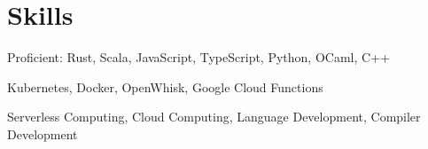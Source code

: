 \section{Skills}

%
{}%
{}%
{}%
{Proficient: Rust, Scala, JavaScript, TypeScript, Python, OCaml, C++%
%
\newline{}
}

%
{}%
{}%
{}%
{Kubernetes, Docker, OpenWhisk, Google Cloud Functions
\newline{}
}

%
{}%
{}%
{}%
{Serverless Computing, Cloud Computing, Language Development, Compiler
Development
\newline{}
}